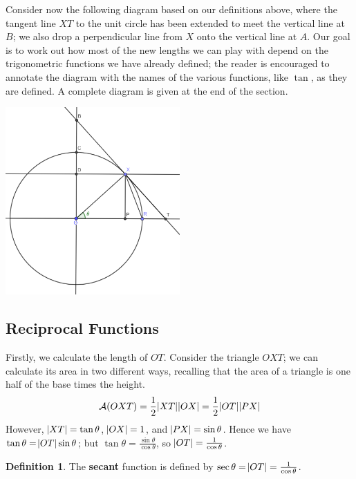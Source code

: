 \documentclass[a4paper,leqno]{article}
\newcommand{\marginsymbol}{\marginpar{\hfill(\ding{43})}}
\numberwithin{equation}{section}
\theoremstyle{definition}
\newtheorem{defn}[equation]{Definition}
\theoremstyle{remark}
\newcommand{\df}[1]{\textbf{#1}}
\begin{document}
Consider now the following diagram based on our definitions above, where the tangent line $ XT $ to the unit circle has been
extended to meet the vertical line at $ B $; we also drop a perpendicular line from $ X $ onto the vertical line at $ A $.
Our goal is to work out how most of the new lengths we can play with depend on the trigonometric functions we have already
defined; the reader is encouraged to annotate the diagram with the names of the various functions, like $ \tan $, as they
are defined. A complete diagram is given at the end of the section.
\begin{center}
  \includegraphics[width=0.5\textwidth]{taxonomy}
\end{center}

\subsection{Reciprocal Functions}
Firstly, we calculate the length of $ OT $. Consider the triangle $ OXT $; we can calculate its area in two different ways,
recalling that the area of a triangle is one half of the base times the height.
\begin{displaymath}
  \mathcal{A}(OXT) = \frac{1}{2}\abs{XT}\abs{OX} = \frac{1}{2}\abs{OT}\abs{PX}
\end{displaymath}
However, $ \abs{XT} = \tan \theta $, $ \abs{OX} = 1 $, and $ \abs{PX} = \sin \theta $. Hence we
have $ \tan \theta = \abs{OT}\sin \theta $; but $ \tan \theta = \frac{\sin \theta}{\cos \theta} $,
so $ \abs{OT} = \frac{1}{\cos \theta} $.
\begin{defn}
  The \df{secant} function is defined by $ \sec \theta = \abs{OT} = \frac{1}{\cos \theta} $. \marginsymbol
\end{defn}
\end{document}
